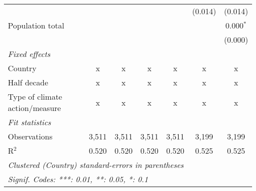 \begin{tabular}{lcccccc}
                                                &         &         &         &         & (0.014)      & (0.014)\\   
   Population total                             &         &         &         &         &              & 0.000$^{*}$\\   
                                                &         &         &         &         &              & (0.000)\\   
   \emph{Fixed effects}\\
   Country                                      & x       & x       & x       & x       & x            & x\\  
   Half decade                                  & x       & x       & x       & x       & x            & x\\  
   Type of climate action/measure               & x       & x       & x       & x       & x            & x\\  
   \midrule \emph{Fit statistics}\\
   Observations                                 & 3,511   & 3,511   & 3,511   & 3,511   & 3,199        & 3,199\\  
   R$^2$                                        & 0.520   & 0.520   & 0.520   & 0.520   & 0.525        & 0.525\\  
   \midrule
   \multicolumn{7}{l}{\emph{Clustered (Country) standard-errors in parentheses}}\\
   \multicolumn{7}{l}{\emph{Signif. Codes: ***: 0.01, **: 0.05, *: 0.1}}\\
\end{tabular}
\par\endgroup


